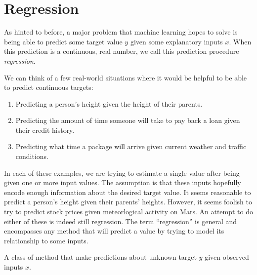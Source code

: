 \chapter{Regression}
As hinted to before, a major problem that machine learning hopes to solve is being able to predict some target value $y$ given some explanatory inputs $x$. When this prediction is a continuous, real number, we call this prediction procedure \emph{regression}.

We can think of a few real-world situations where it would be helpful to be able to predict continuous targets:

\begin{enumerate}
    \item Predicting a person's height given the height of their parents.
    \item Predicting the amount of time someone will take to pay back a loan given their credit history.
    \item Predicting what time a package will arrive given current weather and traffic conditions.
\end{enumerate}

In each of these examples, we are trying to estimate a single value after being given one or more input values. The assumption is that these inputs hopefully encode enough information about the desired target value. It seems reasonable to predict a person's height given their parents' heights. However, it seems foolish to try to predict stock prices given meteorlogical activity on Mars. An attempt to do either of these is indeed still regression. The term ``regression'' is general and encompasses any method that will predict a value by trying to model its relationship to some inputs.

\begin{definition}[regression]
    A class of method that make predictions about unknown target $y$ given observed inputs $x$.
\end{definition}




